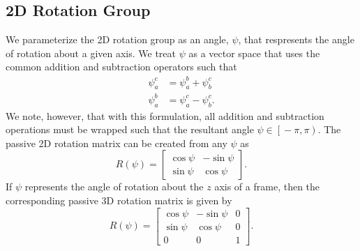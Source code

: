 
\subsection{2D Rotation Group}
We parameterize the 2D rotation group as an angle, $\psi$, that respresents
the angle of rotation about a given axis. We treat $\psi$ as a vector space
that uses the common addition and subtraction operators such that
\begin{align}
  \psi_a^c &= \psi_a^b + \psi_b^c \\
  \psi_a^b &= \psi_a^c - \psi_b^c.
\end{align}
We note, however, that with this formulation, all addition and subtraction
operations must be wrapped such
that the resultant angle $\psi \in \left[ \right. -\pi, \pi \left. \right)$. The
passive 2D
rotation matrix can be created from any $\psi$ as
\begin{equation}
  R \left( \psi \right) = \begin{bmatrix} \cos \psi & -\sin \psi \\ \sin \psi &
  \cos \psi \end{bmatrix}.
\end{equation}
If $\psi$ represents the angle of rotation about the $z$ axis of a frame, then
the corresponding passive 3D rotation matrix is given by
\begin{equation}
  R \left( \psi \right) = \begin{bmatrix}
    \cos \psi & -\sin \psi & 0 \\
    \sin \psi & \cos \psi & 0 \\
    0 & 0 & 1
  \end{bmatrix}.
\end{equation}
